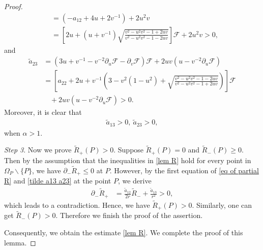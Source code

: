 \documentclass[10pt,a4paper]{amsart}
\begin{document}
\begin{proof}
\begin{equation*}
\begin{aligned}
			& = (- a_{12} +4u +2v^{-1})+ 2u^2 v \\
			& = \left[ 2u + (u + v^{-1}) \sqrt{\frac{v^2-u^{2}v^2-1+2uv}{v^2-u^{2}v^2-1-2uv}} \right] \mathcal{F} + 2u^2 v  > 0,
		\end{aligned}
	\end{equation*}	
	and
	\begin{equation*} 
		\begin{aligned}
			\tilde{a}_{23} &= ( 3u + v^{-1} - v^{-2}  \partial_{u} \mathcal{F} - \partial_{v} \mathcal{F} ) \mathcal{F} + 2uv (u - v^{-2}  \partial_{u} \mathcal{F}) \\
			& = \left[ a_{22} + 2u + v^{-1} \left( 3- v^{2} (1-u^{2}) + \sqrt{\frac{v^2-u^{2}v^2-1-2uv}{v^2-u^{2}v^2-1+2uv}} \right) \right] \mathcal{F} \\
			& \ \ \ \ + 2uv (u - v^{-2}  \partial_{u} \mathcal{F})  > 0.
		\end{aligned}
	\end{equation*}	
	Moreover, it is clear that 
	\begin{equation} \label{tilde a13 a23} 
		\begin{aligned}
			\tilde{a}_{13}>0, \ \tilde{a}_{23}>0,
		\end{aligned}
	\end{equation}	
	when $ \alpha > 1$.
	
	
	{\textit{Step 3}}.	Now we prove $\tilde{R}_{+} (P) > 0$. Suppose $\tilde{R}_{+}(P) = 0$ and $\tilde{R}_{-}(P) \geq 0$. Then by the assumption that the inequalities in \eqref{lem R} hold for every point in $\Omega_{P} \backslash \{P\}$, we have $\partial_{-}\tilde{R}_{+} \leq 0$ at $P$. However, by the first equation of \eqref{eq of partial R} and \eqref{tilde a13 a23} at the point $P$, we derive
	\begin{equation*} 
		\begin{aligned}
			\partial_{-} \tilde{R}_{+} & = \frac{\tilde{a}_{12}}{2r} \tilde{R}_{-} + \frac{\tilde{a}_{13}}{r^2} > 0 ,
		\end{aligned}
	\end{equation*}	
	which leads to a contradiction. Hence, we have
	$\tilde{R}_{+}(P) > 0$. Similarly, one can get $\tilde{R}_{-}(P)> 0$. Therefore we finish the proof of the
	assertion. 
	
	Consequently, we obtain the estimate \eqref{lem R}. We complete the proof of this lemma.
	
\end{proof}
\end{document}
